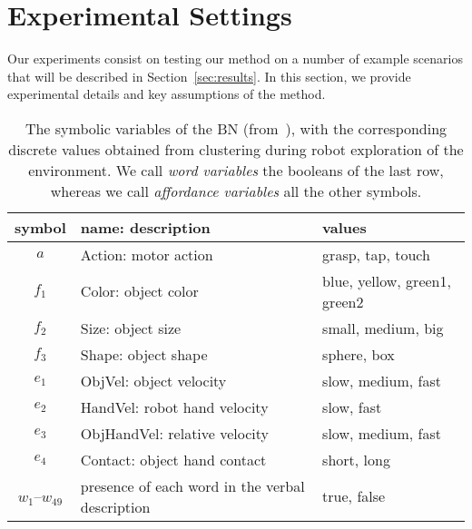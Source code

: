 
\section{Experimental Settings}
\label{sec:experimental_settings}
Our experiments consist on testing our method on a number of example scenarios that will be described in Section~\ref{sec:results}.
In this section, we provide experimental details and key assumptions of the method.

\begin{table}
    \centering
    \caption{The symbolic variables of the \acl{BN} (from~\cite{salvi:2012:smcb}), with the corresponding discrete values obtained from clustering during robot exploration of the environment.
    We call \emph{word variables} the booleans of the last row, whereas we call \emph{affordance variables} all the other symbols.}
    \label{tab:bnsymb}
    \begin{tabular}{cp{3.3cm}l}
    \toprule
    symbol & name: description     & values \\
    \midrule
    $a$    & Action: motor action  & grasp, tap, touch \\
    \midrule
    $f_1$  & Color: object color   & blue, yellow, green1, green2 \\
    $f_2$  & Size: object size     & small, medium, big \\
    $f_3$  & Shape: object shape   & sphere, box \\ %
    \midrule
    $e_1$  & ObjVel: object velocity                     & slow, medium, fast \\
    $e_2$  & HandVel: robot hand velocity                & slow, fast \\
    $e_3$  & ObjHandVel: relative \objecthand{} velocity & slow, medium, fast \\
    $e_4$  & Contact: object hand contact                & short, long \\
    \midrule
    $w_1$--$w_{49}$ & presence of each word in the verbal description & true, false \\
    \bottomrule
    \end{tabular}
\end{table}

